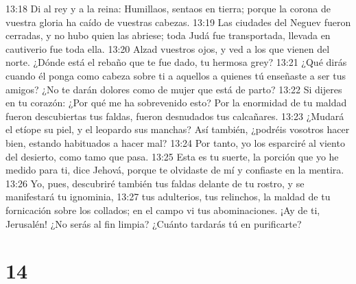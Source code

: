 13:18 Di al rey y a la reina: Humillaos, sentaos en tierra; porque la corona de vuestra gloria ha caído de vuestras cabezas.  
13:19 Las ciudades del Neguev fueron cerradas, y no hubo quien las abriese; toda Judá fue transportada, llevada en cautiverio fue toda ella.  
13:20 Alzad vuestros ojos, y ved a los que vienen del norte. ¿Dónde está el rebaño que te fue dado, tu hermosa grey?  
13:21 ¿Qué dirás cuando él ponga como cabeza sobre ti a aquellos a quienes tú enseñaste a ser tus amigos? ¿No te darán dolores como de mujer que está de parto?  
13:22 Si dijeres en tu corazón: ¿Por qué me ha sobrevenido esto? Por la enormidad de tu maldad fueron descubiertas tus faldas, fueron desnudados tus calcañares.  
13:23 ¿Mudará el etíope su piel, y el leopardo sus manchas? Así también, ¿podréis vosotros hacer bien, estando habituados a hacer mal?  
13:24 Por tanto, yo los esparciré al viento del desierto, como tamo que pasa.  
13:25 Esta es tu suerte, la porción que yo he medido para ti, dice Jehová, porque te olvidaste de mí y confiaste en la mentira.  
13:26 Yo, pues, descubriré también tus faldas delante de tu rostro, y se manifestará tu ignominia,  
13:27 tus adulterios, tus relinchos, la maldad de tu fornicación sobre los collados; en el campo vi tus abominaciones. ¡Ay de ti, Jerusalén! ¿No serás al fin limpia? ¿Cuánto tardarás tú en purificarte?  

\chapter{14}

